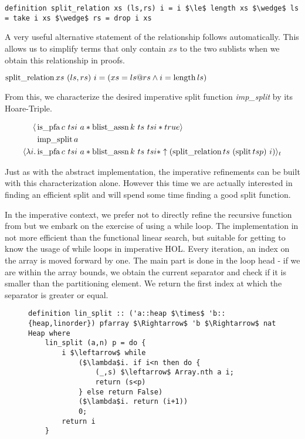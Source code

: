 \begin{lstlisting}[mathescape=true, language=Isabelle]
definition split_relation xs (ls,rs) i = i $\le$ length xs $\wedge$ ls = take i xs $\wedge$ rs = drop i xs
\end{lstlisting}

A very useful alternative statement of the relationship follows automatically.
This allows us to simplify terms that only contain $xs$
to the two sublists when we obtain this relationship in proofs.

\begin{lemma}
    $\operatorname{split\_relation} xs\ (ls,rs)\ i = (xs = ls@rs \wedge i = \operatorname{length} ls)$
\end{lemma}

From this, we characterize the desired imperative
split function \textit{imp\_split} by its Hoare-Triple.

\begin{align*}
    \langle & \operatorname{is\_pfa} c\ tsi\ a * \operatorname{blist\_assn} k\ ts\ tsi *  true \rangle \\
            & \operatorname{imp\_split} a \\
\langle\lambda i. & \operatorname{is\_pfa} c\ tsi\ a * \operatorname{blist\_assn} k\ ts\ tsi * \uparrow(\operatorname{split\_relation} ts\ (\operatorname{split} ts p)\ i)\rangle_t
\end{align*}

Just as with the abstract implementation,
the imperative refinements can be built with this characterization alone.
However this time we are actually interested in finding an
efficient split and will spend some time finding
a good split function.

In the imperative context, we prefer not to directly
refine the recursive function from 
but we embark on the exercise of using a while loop.
The implementation in 
not more efficient than the functional linear search,
but suitable for getting to know
the usage of while loops in imperative HOL.
Every iteration, an index on the array is moved forward by one.
The main part is done in the loop head - if we
are within the array bounds,
we obtain the current separator and check if it is
smaller than the partitioning element.
We return the first index at which the separator is greater or equal.

\begin{figure}
\begin{lstlisting}[mathescape=true, language=Isabelle, caption={The imperative linear split},
    label={lst:imp-linear-split}]
definition lin_split :: ('a::heap $\times$ 'b::{heap,linorder}) pfarray $\Rightarrow$ 'b $\Rightarrow$ nat Heap where
    lin_split (a,n) p = do { 
        i $\leftarrow$ while  
            ($\lambda$i. if i<n then do { 
                (_,s) $\leftarrow$ Array.nth a i; 
                return (s<p) 
            } else return False)  
            ($\lambda$i. return (i+1))  
            0; 
        return i 
    }
\end{lstlisting}
\end{figure}

